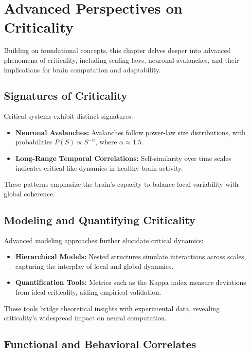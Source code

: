 
\section{Advanced Perspectives on Criticality}

Building on foundational concepts, this chapter delves deeper into advanced phenomena of criticality, including scaling laws, neuronal avalanches, and their implications for brain computation and adaptability.

\subsection*{Signatures of Criticality}

Critical systems exhibit distinct signatures:
\begin{itemize}
    \item \textbf{Neuronal Avalanches:} Avalanches follow power-law size distributions, with probabilities $P(S) \propto S^{-\alpha}$, where $\alpha \approx 1.5$.
    \item \textbf{Long-Range Temporal Correlations:} Self-similarity over time scales indicates critical-like dynamics in healthy brain activity.
\end{itemize}

These patterns emphasize the brain’s capacity to balance local variability with global coherence.

\subsection*{Modeling and Quantifying Criticality}

Advanced modeling approaches further elucidate critical dynamics:
\begin{itemize}
    \item \textbf{Hierarchical Models:} Nested structures simulate interactions across scales, capturing the interplay of local and global dynamics.
    \item \textbf{Quantification Tools:} Metrics such as the Kappa index measure deviations from ideal criticality, aiding empirical validation.
\end{itemize}

These tools bridge theoretical insights with experimental data, revealing criticality’s widespread impact on neural computation.

\subsection*{Functional and Behavioral Correlates}

